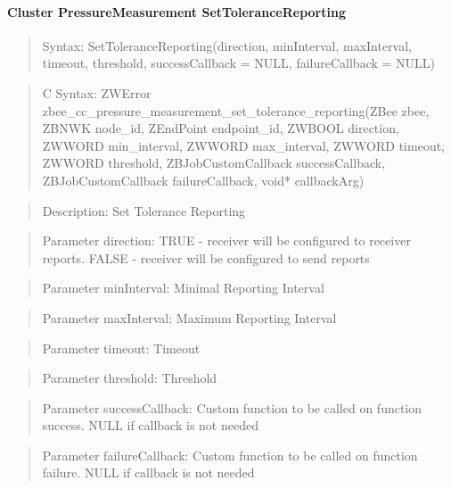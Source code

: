 \paragraph{Cluster PressureMeasurement SetToleranceReporting}
\begin{quote}Syntax: SetToleranceReporting(direction, minInterval, maxInterval, timeout, threshold, successCallback = NULL, failureCallback = NULL)\end{quote}
\begin{quote}C Syntax: ZWError zbee\_cc\_pressure\_measurement\_set\_tolerance\_reporting(ZBee zbee, ZBNWK node\_id, ZEndPoint endpoint\_id, ZWBOOL direction, ZWWORD min\_interval, ZWWORD max\_interval, ZWWORD timeout, ZWWORD threshold, ZBJobCustomCallback successCallback, ZBJobCustomCallback failureCallback, void* callbackArg)\end{quote}
\begin{quote}Description: Set Tolerance Reporting\end{quote}
\begin{quote}Parameter direction: TRUE  - receiver will be configured to receiver reports. FALSE - receiver will be configured to send reports\end{quote}
\begin{quote}Parameter minInterval: Minimal Reporting Interval\end{quote}
\begin{quote}Parameter maxInterval: Maximum Reporting Interval\end{quote}
\begin{quote}Parameter timeout: Timeout\end{quote}
\begin{quote}Parameter threshold: Threshold\end{quote}
\begin{quote}Parameter successCallback: Custom function to be called on function success. NULL if callback is not needed\end{quote}
\begin{quote}Parameter failureCallback: Custom function to be called on function failure. NULL if callback is not needed\end{quote}


